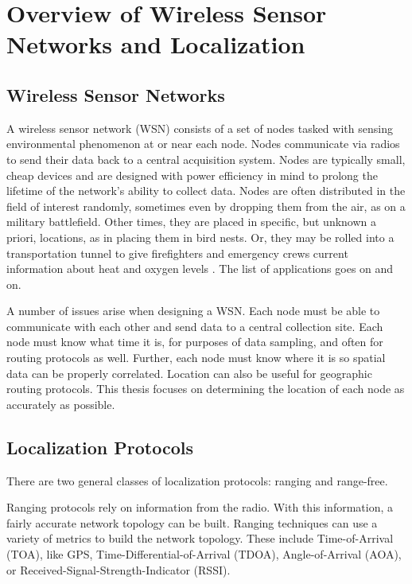 \chapter{Overview of Wireless Sensor Networks and Localization}
\section{Wireless Sensor Networks}

A wireless sensor network (WSN) consists of a set of nodes tasked with sensing environmental phenomenon at or near each node.  Nodes communicate via radios to send their data back to a central acquisition system.  Nodes are typically small, cheap devices and are designed with power efficiency in mind to prolong the lifetime of the network's ability to collect data.  Nodes are often distributed in the field of interest randomly, sometimes even by dropping them from the air, as on a military battlefield.  Other times, they are placed in specific, but unknown a priori, locations, as in placing them in bird nests\cite{birds}.  Or, they may be rolled into a transportation tunnel to give firefighters and emergency crews current information about heat and oxygen levels \cite{runes}.  The list of applications goes on and on.

A number of issues arise when designing a WSN.  Each node must be able to communicate with each other and send data to a central collection site.  Each node must know what time it is, for purposes of data sampling, and often for routing protocols as well.  Further, each node must know where it is so spatial data can be properly correlated.  Location can also be useful for geographic routing protocols.  This thesis focuses on determining the location of each node as accurately as possible.

\section{Localization Protocols}

There are two general classes of localization protocols: ranging and range-free.  

Ranging protocols rely on information from the radio. With this information, a fairly accurate network topology can be built.  Ranging techniques can use a variety of metrics to build the network topology.  These include Time-of-Arrival (TOA), like GPS\cite{Wellenhoff},  Time-Differential-of-Arrival (TDOA)\cite{Savvides}, Angle-of-Arrival (AOA)\cite{APS-AOA}, or Received-Signal-Strength-Indicator (RSSI)\cite{Patwari}.  

